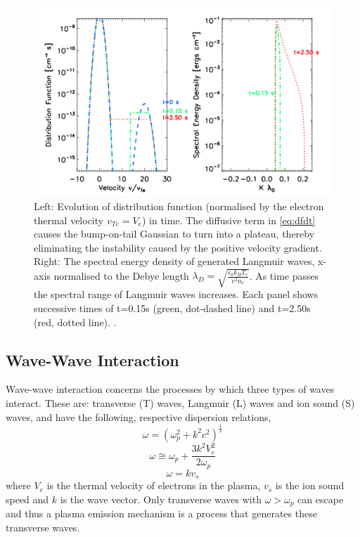 \begin{figure}
    \centering
    \includegraphics[width=0.75\columnwidth]{Images/L_wave_growth.png}
    \caption[Langmuir wave distriburtion function and spectral energy density.]{Left: Evolution of distribution function (normalised by the electron thermal velocity $v_{Te}=V_e$) in time. The diffusive term in \ref{eq:dfdt} causes the bump-on-tail Gaussian to turn into a plateau, thereby eliminating the instability caused by the positive velocity gradient. Right: The spectral energy density of generated Langmuir waves, x-axis normalised to the Debye length $\lambda_D=\sqrt{\frac{\epsilon_0 k_B T_e}{e^2 n_e}}$. As time passes the spectral range of Langmuir waves increases. Each panel shows successive times of t=0.15s (green, dot-dashed line) and t=2.50s (red, dotted line). \citep[Figure taken from][]{Reid2014}.} %
    \label{fig:Lwavegrowth}
\end{figure}

\subsection{Wave-Wave Interaction}\label{Plasma Emission}
Wave-wave interaction concerns the processes by which three types of waves interact. These are: transverse (T) waves, Langmuir (L) waves and ion sound (S) waves, and have the following, respective dispersion relations,
$$ \omega=(\omega_p^2 +k^2c^2)^{\frac{1}{2}} $$
$$ \omega \cong \omega_p + \frac{3k^2V_e^2}{2 \omega_p}$$
$$ \omega = kv_s $$
where $V_e$ is the thermal velocity of electrons in the plasma, $v_s$ is the ion sound speed and $k$ is the wave vector. Only transverse waves with $\omega > \omega_p $ can escape and thus a plasma emission mechanism is a process that generates these transverse waves. 

